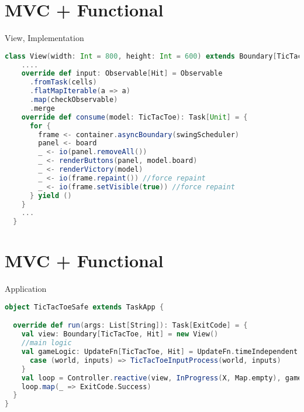 \documentclass[presentation]{beamer}
\begin{document}
\section{MVC + Functional}
\begin{frame}[fragile]{View, Implementation}

\begin{lstlisting}[language=Scala]
  class View(width: Int = 800, height: Int = 600) extends Boundary[TicTacToe, Hit] {
    ....
    override def input: Observable[Hit] = Observable
      .fromTask(cells)
      .flatMapIterable(a => a)
      .map(checkObservable)
      .merge
    override def consume(model: TicTacToe): Task[Unit] = {
      for {
        frame <- container.asyncBoundary(swingScheduler)
        panel <- board
        _ <- io(panel.removeAll())
        _ <- renderButtons(panel, model.board)
        _ <- renderVictory(model)
        _ <- io(frame.repaint()) //force repaint
        _ <- io(frame.setVisible(true)) //force repaint
      } yield ()
    }
    ...
  }
\end{lstlisting}
\end{frame}

\section{MVC + Functional}
\begin{frame}[fragile]{Application}

\begin{lstlisting}[language=Scala]
object TicTacToeSafe extends TaskApp {

  override def run(args: List[String]): Task[ExitCode] = {
    val view: Boundary[TicTacToe, Hit] = new View()
    //main logic
    val gameLogic: UpdateFn[TicTacToe, Hit] = UpdateFn.timeIndependent { 
      case (world, inputs) => TicTacToeInputProcess(world, inputs)
    }
    val loop = Controller.reactive(view, InProgress(X, Map.empty), gameLogic)
    loop.map(_ => ExitCode.Success)
  }
}
\end{lstlisting}
\end{frame}
\end{document}
